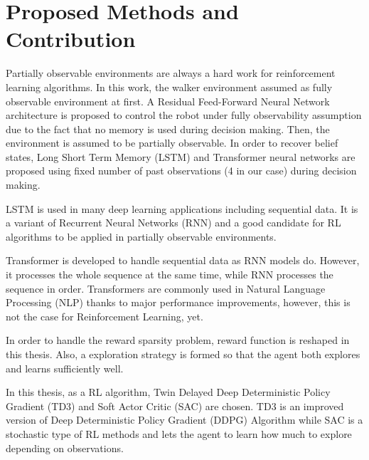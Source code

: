 \section{Proposed Methods and Contribution}
\label{sec:proposed_methods}

Partially observable environments are always a hard work for reinforcement learning algorithms. 
In this work, the walker environment assumed as fully observable environment at first. 
A Residual Feed-Forward Neural Network architecture is proposed to control 
the robot under fully observability assumption due to the fact that no memory is used during decision making. 
Then, the environment is assumed to be partially observable. 
In order to recover belief states, Long Short Term Memory (LSTM) and 
Transformer neural networks are proposed using fixed number of 
past observations (4 in our case) during decision making. 

LSTM is used in many deep learning applications including sequential data. 
It is a variant of Recurrent Neural Networks (RNN) and a good candidate for RL algorithms to be applied in partially observable environments. 

Transformer is developed to handle sequential data as RNN models do. 
However, it processes the whole sequence at the same time, while RNN processes the sequence in order. 
Transformers are commonly used in Natural Language Processing (NLP) thanks to major performance improvements, however, this is not the case for Reinforcement Learning, yet.

In order to handle the reward sparsity problem, reward function is reshaped in this thesis. Also, a exploration strategy is formed so that the agent both explores and learns sufficiently well. 

In this thesis, as a RL algorithm, Twin Delayed Deep Deterministic Policy Gradient (TD3) and Soft Actor Critic (SAC) are chosen. 
TD3 is an improved version of Deep Deterministic Policy Gradient (DDPG) Algorithm while SAC is a stochastic type of RL methods and lets the agent to learn how much to explore depending on observations.
